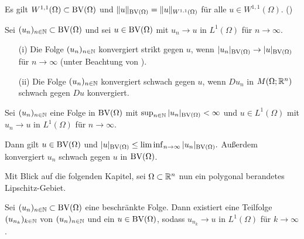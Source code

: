 \begin{remark}
  Es gilt $W^{1,1}(\Omega)\subset\textup{BV}(\Omega)$ und 
  $\Vert u \Vert_{\textup{BV}(\Omega)}=\Vert u \Vert_{W^{1,1}(\Omega)}$ für alle
  $u\in W^{1,1}(\Omega)$. (\cite[S. 394]{ABM14})
\end{remark}

\begin{definition}
  Sei $(u_n)_{n\in\mathbb{N}}\subset \textup{BV}(\Omega)$ und sei $u\in \textup{BV}(\Omega)$ mit
  $u_n\rightarrow u$ in $L^1(\Omega)$ für $n\rightarrow\infty$.
  \begin{itemize}
    \item[(i)]
      Die Folge $(u_n)_{n\in\mathbb{N}}$ konvergiert strikt gegen $u$,
      wenn $|u_n|_{\textup{BV}(\Omega)}\rightarrow |u|_{\textup{BV}(\Omega)}$ für
      $n\rightarrow\infty$
      (unter Beachtung von \cite[Remark 10.1.1]{ABM14}).
    \item[(ii)] Die Folge $(u_n)_{n\in\mathbb{N}}$ konvergiert
      schwach gegen $u$, wenn
      $Du_n$ in 
      $M(\Omega;\mathbb{R}^n)$ schwach gegen $Du$ konvergiert.
  \end{itemize}
\end{definition}

\begin{theorem}
  \label{thm:wlsc}
  Sei $(u_n)_{n\in\mathbb{N}}$ eine Folge in $\textup{BV}(\Omega)$ mit
  $\sup_{n\in\mathbb{N}}|u_n|_{\textup{BV}(\Omega)}< \infty$ und $u\in L^1(\Omega)$ 
  mit $u_n\rightarrow u$ in $L^1(\Omega)$ für $n\rightarrow\infty$.

  Dann gilt $u\in\textup{BV}(\Omega)$ und $|u|_{\textup{BV}(\Omega)}\leq
  \liminf_{n\rightarrow\infty}|u_n|_{\textup{BV}(\Omega)}.$
  Außerdem konvergiert $u_n$ schwach gegen $u$ in $\textup{BV}(\Omega)$.
\end{theorem}

Mit Blick auf die folgenden Kapitel, sei $\Omega\subset\mathbb{R}^n$ nun ein
polygonal berandetes Lipschitz-Gebiet.

\begin{theorem}
  \label{thm:l1ConvergentSubsequence}
  Sei $(u_n)_{n\in\mathbb{N}}\subset \textup{BV}(\Omega)$ eine beschränkte Folge. Dann 
  existiert eine Teilfolge $(u_{n_k})_{k\in\mathbb{N}}$ von
  $(u_n)_{n\in\mathbb{N}}$ und ein $u\in\textup{BV}(\Omega)$, sodass
  $u_{n_k}\to u$ in $L^1(\Omega)$ für $k\to \infty$.
\end{theorem}

